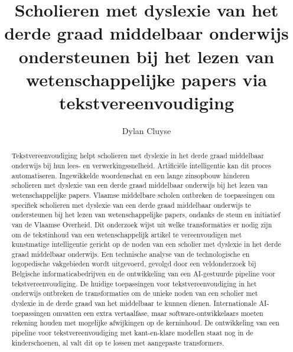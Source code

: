 \documentclass{hogent-article}
\title{Scholieren met dyslexie van het derde graad middelbaar onderwijs ondersteunen bij het lezen van wetenschappelijke papers via tekstvereenvoudiging}
\author{Dylan Cluyse}
\begin{document}
\begin{abstract}
Tekstvereenvoudiging helpt scholieren met dyslexie in het derde graad middelbaar onderwijs bij hun lees- en verwerkingssnelheid. Artificiële intelligentie kan dit proces automatiseren. Ingewikkelde woordenschat en een lange zinsopbouw hinderen scholieren met dyslexie van een derde graad middelbaar onderwijs bij het lezen van wetenschappelijke papers. Vlaamse middelbare scholen ontbreken de toepassingen om specifiek scholieren met dyslexie van een derde graad middelbaar onderwijs te ondersteunen bij het lezen van wetenschappelijke papers, ondanks de steun en initiatief van de Vlaamse Overheid. Dit onderzoek wijst uit welke transformaties er nodig zijn om de tekstinhoud van een wetenschappelijk artikel te vereenvoudigen met kunstmatige intelligentie gericht op de noden van een scholier met dyslexie in het derde graad middelbaar onderwijs. Een technische analyse van de technologische en logopedische vakgebieden wordt uitgevoerd, gevolgd door een veldonderzoek bij Belgische informaticabedrijven en de ontwikkeling van een AI-gestuurde pipeline voor tekstvereenvoudiging. De huidige toepassingen voor tekstvereenvoudiging in het onderwijs ontbreken de transformaties om de unieke noden van een scholier met dyslexie in de derde graad van het middelbaar te kunnen dienen. Internationale AI-toepassingen omvatten een extra vertaalfase, maar software-ontwikkelaars moeten rekening houden met mogelijke afwijkingen op de kerninhoud. De ontwikkeling van een pipeline voor tekstvereenvoudiging met kant-en-klare modellen staat nog in de kinderschoenen, al valt dit op te lossen met aangepaste transformers.
\end{abstract}

\tableofcontents



\printbibliography[heading=bibintoc]
\end{document}

